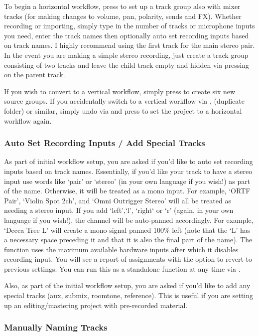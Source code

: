 \documentclass[10pt,american]{article}
\begin{document}
To begin a horizontal workflow, press  to set up a track group also
with mixer tracks (for making changes to volume, pan, polarity, sends and FX).
Whether recording or importing, simply type in the number of tracks or
microphone inputs you need, enter the track names then optionally auto set
recording inputs based on track names. I highly recommend using the first track
for the main stereo pair. In the event you are making a simple stereo recording,
just create a track group consisting of two tracks and leave the child track
empty and hidden via pressing  on the parent track.

If you wish to convert to a vertical workflow, simply press  to create
six new source groups. If you accidentally switch to a vertical workflow via
, \keys{\textbackslash} (duplicate folder) or similar, simply undo via
 and press  to set the project to a horizontal workflow
again.

\subsubsection{Auto Set Recording Inputs / Add Special Tracks}

As part of initial workflow setup, you are asked if you'd like to auto set
recording inputs based on track names. Essentially, if you'd like your track to
have a stereo input use words like `pair' or `stereo' (in your own language if
you wish!) as part of the name. Otherwise, it will be treated as a mono input.
For example, `ORTF Pair', `Violin Spot 2ch', and `Omni Outrigger Stereo' will
all be treated as needing a stereo input. If you add `left',`l', `right` or `r'
(again, in your own language if you wish!), the channel will be auto-panned
accordingly. For example, `Decca Tree L' will create a mono signal panned 100\%
left (note that the `L' has a necessary space preceding it and that it is also
the final part of the name). The function uses the maximum available hardware
inputs after which it disables recording input. You will see a report of
assignments with the option to revert to previous settings. You can run this as
a standalone function at any time via .

Also, as part of the initial workflow setup, you are asked if you'd like to add
any special tracks (aux, submix, roomtone, reference). This is useful if you are
setting up an editing/mastering project with pre-recorded material.

\subsubsection{Manually Naming Tracks }
\end{document}
